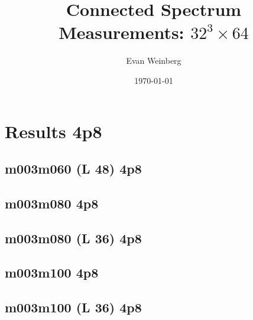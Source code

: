 \documentclass[pdftex,letterpaper,10pt]{article}
\begin{document}
\title{Connected Spectrum Measurements: $32^3 \times 64$}
\author{Evan Weinberg}
\date{\today}
\maketitle

\tableofcontents

\clearpage




\clearpage

\section{Results 4p8}

\subsection{m003m060 (L 48) 4p8}



\clearpage \subsection{m003m080 4p8}



\clearpage \subsection{m003m080 (L 36) 4p8}



\clearpage \subsection{m003m100 4p8}



\clearpage \subsection{m003m100 (L 36) 4p8}
\end{document}
